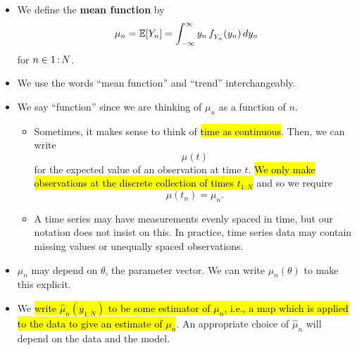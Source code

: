 \documentclass[]{article}
\begin{document}
\begin{itemize}
\item
  We define the \textbf{mean function} by
  \[ \mu_n = \mathbb{E}[Y_n] = \int_{-\infty}^\infty y_n \, f^{}_{Y_n}(y_n)\, dy_n\]
  for \(n\in 1{\,{:}\,}N\).
\item
  We use the words ``mean function'' and ``trend'' interchangeably.
\item
  We say ``function'' since we are thinking of \(\mu_n\) as a function
  of \(n\).

  \begin{itemize}
  \item
    Sometimes, it makes sense to think of \hl{time as continuous}. Then, we
    can write \[\mu(t)\] for the expected value of an observation at
    time \(t\). \hl{We only make observations at the discrete collection of
    times $t_{1:N}$} and so we require $$\mu(t_n)= \mu_n.$$
  \item
    A time series may have measurements evenly spaced in time, but our
    notation does not insist on this. In practice, time series data may
    contain missing values or unequally spaced observations.
  \end{itemize}
\item
  \(\mu_n\) may depend on \(\theta\), the parameter vector. We can write
  \(\mu_n(\theta)\) to make this explicit.
\item
  We \hl{write $\hat\mu_n(y_{1:N})$ to be some estimator of $\mu_n$,
  i.e., a map which is applied to the data to give an estimate of
  $\mu_n$}. An appropriate choice of \(\hat\mu_n\) will depend on the
  data and the model.
  

\end{itemize}
\end{document}
